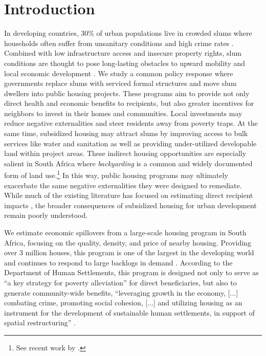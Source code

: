 \documentclass[12pt]{article}
\begin{document}
\section{Introduction} \label{sec:introduction}

In developing countries, 30\% of urban populations live in crowded slums where households often suffer from unsanitary conditions and high crime rates \citep{mdg}. Combined with low infrastructure access and insecure property rights, slum conditions are thought to pose long-lasting obstacles to upward mobility and local economic development \citep{10.1257/jep.27.4.187}. We study a common policy response where governments replace slums with serviced formal structures and move slum dwellers into public housing projects. These programs aim to provide not only direct health and economic benefits to recipients, but also greater incentives for neighbors to invest in their homes and communities.  Local investments may reduce negative externalities and steer residents away from poverty traps. At the same time, subsidized housing may attract slums by improving access to bulk services like water and sanitation as well as providing under-utilized developable land within project areas. These indirect housing opportunities are especially salient in South Africa where {\it backyarding} is a common and widely documented form of land use.\footnote{See recent work by \cite{Brueckner2018backyarding}.} In this way, public housing programs may ultimately exacerbate the same negative externalities they were designed to remediate. While much of the existing literature has focused on estimating direct recipient impacts \citep{cattaneo2009housing,franklin2016enabled,galiani2017shelter}, the broader consequences of subsidized housing for urban development remain poorly understood.


We estimate economic spillovers from a large-scale housing program in South Africa, focusing on the quality, density, and price of nearby housing. Providing over 3 million houses, this program is one of the largest in the developing world and continues to respond to large backlogs in demand \citep{dhsreports}.  According to the Department of Human Settlements, this program is designed not only to serve as ``a key strategy for poverty alleviation'' for direct beneficiaries, but also to generate community-wide benefits, ``leveraging growth in the economy, [...] combating crime, promoting social cohesion, [...] and utilizing housing as an instrument for the development of sustainable human settlements, in support of spatial restructuring'' \citep{bng}. 
\end{document}
